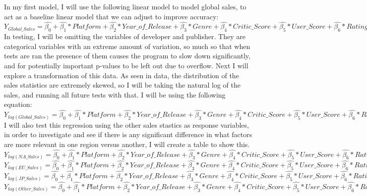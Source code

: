 \documentclass[12pt]{article}
\begin{document}
In my first model, I will use the following linear model to model global sales, to act as a baseline linear model that we can adjust to improve accuracy:
$Y_{Global\_Sales}=\hat{\beta_{0}}+\hat{\beta_{1}}*Platform+\hat{\beta_{2}}*Year\_of\_Release+\hat{\beta_{3}}*Genre+\hat{\beta_{4}}*Critic\_Score+\hat{\beta_{5}}*User\_Score+\hat{\beta_{6}}*Rating+\hat{\beta_{7}}*Critic\_Count+\hat{\beta_{8}}*Critic\_Count$
In testing, I will be omitting the variables of developer and publisher. They are categorical variables with an extreme amount of variation,
so much so that when tests are ran the presence of them causes the program to slow down significantly, and for potentially important p-values to be left out due to overflow.
Next I will explore a transformation of this data. As seen in data, the distribution of the sales statistics are extremely skewed, so I will be taking  
the natural log of the sales, and running all future tests with that. I will be using the following equation:
$Y_{log(Global\_Sales)}=\hat{\beta_{0}}+\hat{\beta_{1}}*Platform+\hat{\beta_{2}}*Year\_of\_Release+\hat{\beta_{3}}*Genre+\hat{\beta_{4}}*Critic\_Score+\hat{\beta_{5}}*User\_Score+\hat{\beta_{6}}*Rating+\hat{\beta_{7}}*Critic\_Count+\hat{\beta_{8}}*Critic\_Count$
I will also test this regression using the other sales stastics as response variables, in order to investigate and see if there is any significant difference in what factors are more relevant in one region versus another, I will create a table to show this.
$Y_{log(NA\_Sales)}=\hat{\beta_{0}}+\hat{\beta_{1}}*Platform+\hat{\beta_{2}}*Year\_of\_Release+\hat{\beta_{3}}*Genre+\hat{\beta_{4}}*Critic\_Score+\hat{\beta_{5}}*User\_Score+\hat{\beta_{6}}*Rating+\hat{\beta_{7}}*Critic\_Count+\hat{\beta_{8}}*Critic\_Count$
$Y_{log(EU\_Sales)}=\hat{\beta_{0}}+\hat{\beta_{1}}*Platform+\hat{\beta_{2}}*Year\_of\_Release+\hat{\beta_{3}}*Genre+\hat{\beta_{4}}*Critic\_Score+\hat{\beta_{5}}*User\_Score+\hat{\beta_{6}}*Rating+\hat{\beta_{7}}*Critic\_Count+\hat{\beta_{8}}*Critic\_Count$
$Y_{log(JP\_Sales)}=\hat{\beta_{0}}+\hat{\beta_{1}}*Platform+\hat{\beta_{2}}*Year\_of\_Release+\hat{\beta_{3}}*Genre+\hat{\beta_{4}}*Critic\_Score+\hat{\beta_{5}}*User\_Score+\hat{\beta_{6}}*Rating+\hat{\beta_{7}}*Critic\_Count+\hat{\beta_{8}}*Critic\_Count$
$Y_{log(Other\_Sales)}=\hat{\beta_{0}}+\hat{\beta_{1}}*Platform+\hat{\beta_{2}}*Year\_of\_Release+\hat{\beta_{3}}*Genre+\hat{\beta_{4}}*Critic\_Score+\hat{\beta_{5}}*User\_Score+\hat{\beta_{6}}*Rating+\hat{\beta_{7}}*Critic\_Count+\hat{\beta_{8}}*Critic\_Count$
\end{document}
